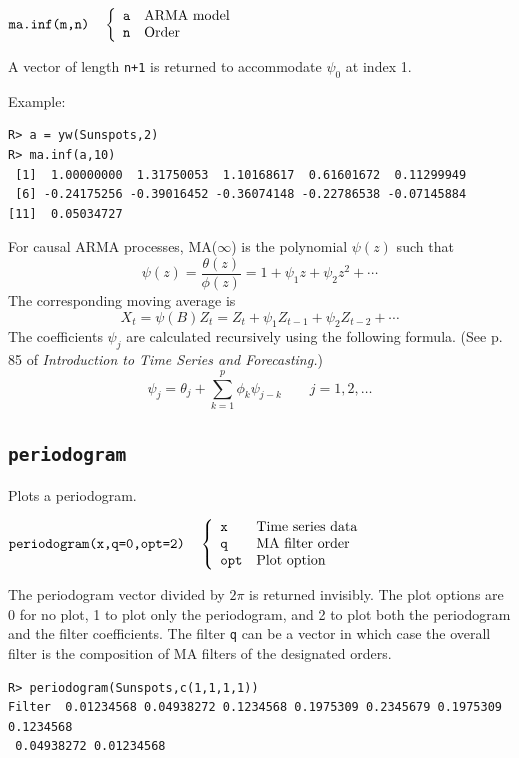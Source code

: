 \documentclass[11pt]{article}
\begin{document}
\bigskip
$
\hbox{\tt ma.inf(m,n)}\quad\left\{\begin{array}{ll}
{\tt a} & \hbox{ARMA model}\\
{\tt n} & \hbox{Order}
\end{array}\right.
$

\bigskip
\noindent
A vector of length {\tt n+1} is returned to accommodate $\psi_0$ at index 1.

\bigskip
\noindent
Example:

\begin{verbatim}
R> a = yw(Sunspots,2)
R> ma.inf(a,10)
 [1]  1.00000000  1.31750053  1.10168617  0.61601672  0.11299949
 [6] -0.24175256 -0.39016452 -0.36074148 -0.22786538 -0.07145884
[11]  0.05034727
\end{verbatim}

\bigskip
\noindent
For causal ARMA processes,
MA($\infty$) is the polynomial $\psi(z)$ such that
\[
\psi(z)=\frac{\theta(z)}{\phi(z)}=1+\psi_1z+\psi_2z^2+\cdots
\]
The corresponding moving average is
\[
X_t=\psi(B)Z_t=Z_t+\psi_1Z_{t-1}+\psi_2Z_{t-2}+\cdots
\]
The coefficients $\psi_j$ are calculated recursively using the following formula.
(See p. 85 of {\it Introduction to Time Series and Forecasting.})
\[
\psi_j=
\theta_j+\sum_{k=1}^p\phi_k\psi_{j-k}\qquad j=1,2,\ldots
\]

\newpage

\subsection{\tt periodogram}
Plots a periodogram.

\bigskip
$
\hbox{\tt periodogram(x,q=0,opt=2)}\quad\left\{\begin{array}{ll}
{\tt x} & \hbox{Time series data}\\
{\tt q} & \hbox{MA filter order}\\
{\tt opt} & \hbox{Plot option}
\end{array}\right.
$

\bigskip
\noindent
The periodogram vector divided by $2\pi$ is returned invisibly.
The plot options are 0 for no plot, 1 to plot only the periodogram,
and 2 to plot both the periodogram and the filter coefficients.
The filter {\tt q} can be a vector in which case the overall filter is the
composition of MA filters of the designated orders.

\begin{verbatim}
R> periodogram(Sunspots,c(1,1,1,1))
Filter  0.01234568 0.04938272 0.1234568 0.1975309 0.2345679 0.1975309 0.1234568
 0.04938272 0.01234568 
\end{verbatim}
\end{document}
